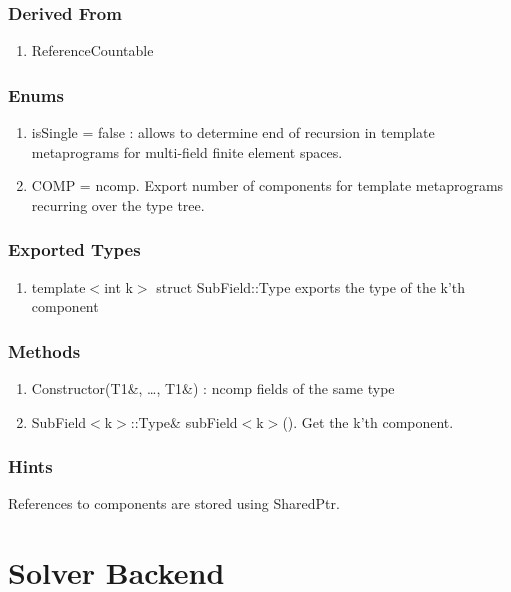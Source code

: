 \documentclass[11pt,a4paper,DIV11,%
notitlepage,oneside,abstracton,%
bibtotoc]{scrartcl}
\begin{document}
\subsubsection{Derived From}

\begin{enumerate}[1)]
\item ReferenceCountable
\end{enumerate}

\subsubsection{Enums}

\begin{enumerate}[1)]
\item isSingle = false : allows to determine end of recursion in
  template metaprograms for multi-field finite element spaces.
\item COMP = ncomp. Export number of components for template
  metaprograms recurring over the type tree.
\end{enumerate}

\subsubsection{Exported Types}

\begin{enumerate}[1)]
\item template$<$int k$>$ struct SubField::Type exports the type of
  the k'th component
\end{enumerate}

\subsubsection{Methods}

\begin{enumerate}[1)]
\item Constructor(T1\&, \ldots , T1\&) : ncomp fields of the same type
\item SubField$<$k$>$::Type\& subField$<$k$>$(). Get the k'th component.
\end{enumerate}

\subsubsection{Hints}

References to components are stored using SharedPtr.

\section{Solver Backend}
\end{document}

